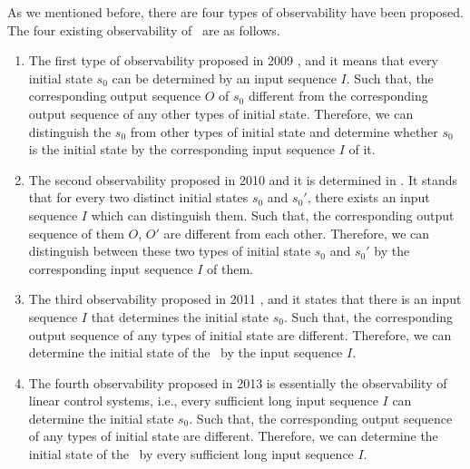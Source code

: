 As we mentioned before, there are four types of observability have been proposed. The four existing observability of \BCNs\ are as follows.
\begin{enumerate}
	\item The first type of observability proposed in 2009 \cite{cheng2009controllability}, and it means that every initial state $s_0$ can be determined by an input sequence $I$. Such that, the corresponding output sequence $O$ of $s_0$ different from the corresponding output sequence of any other types of initial state. Therefore, we can distinguish the $s_0$ from other types of initial state and determine whether $s_0$ is the initial state by the corresponding input sequence $I$ of it.
	\item 
	The second observability proposed in 2010 \cite{Zhao2010Input} and it is determined in \cite{Li2015Controllability}. It stands that for every two distinct initial states $s_0$ and $s_0'$, there exists an input sequence $I$ which can distinguish them. Such that, the corresponding output sequence of them $O$, $O'$ are different from each other. Therefore, we can distinguish between these two types of initial state $s_0$ and $s_0'$ by the corresponding input sequence $I$ of them.	
	\item The third observability proposed in 2011 \cite{Cheng2011Identification}, and it states that there is an input sequence $I$ that determines the initial state $s_0$. Such that, the corresponding output sequence of any types of initial state are different. Therefore, we can determine the initial state of the \BCN\ by the input sequence $I$.
	
	\item  The fourth observability proposed in 2013 \cite{Fornasini2013Observability} is essentially the observability of linear control systems, i.e., every sufficient long input sequence $I$ can determine the initial state $s_0$. Such that, the corresponding output sequence of any types of initial state are different. Therefore, we can determine the initial state of the \BCN\ by every sufficient long input sequence $I$.
\end{enumerate}
 

